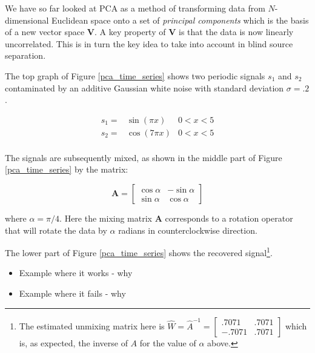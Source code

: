 \documentclass[11pt, oneside, a4paper]{report}
\begin{document}
We have so far looked at PCA as a method of transforming data from
$N$-dimensional Euclidean space onto a set of \emph{principal components}
which is the basis of a new vector space $\boldsymbol{V}$. A key property of $\boldsymbol{V}$ is
that the data is now linearly uncorrelated. This is in turn the key
idea to take into account in blind source separation.

The top graph of Figure \ref{pca_time_series} shows two periodic
signals $s_1$ and $s_2$ contaminated by an additive Gaussian white
noise with standard deviation $\sigma = .2$.


\begin{equation}
      \begin{array}{lll}
        s_1 = & \sin(\pi x) & 0<x<5\\
        s_2 = & \cos(7 \pi x) & 0<x<5\\
    \end{array}
\end{equation}

The signals are subsequently mixed, as shown in the middle part of
Figure \ref{pca_time_series} by the matrix:


\begin{equation}
  \boldsymbol{A} = \begin{bmatrix} \cos \alpha & -\sin \alpha \\ \sin \alpha & \cos \alpha \end{bmatrix}
\end{equation}

where $\alpha = \pi/4$. Here the mixing matrix $\boldsymbol{A}$ corresponds to a
rotation operator that will rotate the data by $\alpha$ radians in
counterclockwise direction. 


The lower part of Figure \ref{pca_time_series} shows the recovered
signal\footnote{The estimated unmixing matrix here is $\hat{W} =
  \hat{A}^{-1} = \begin{bmatrix} .7071 & .7071 \\ -.7071 &
    .7071 \end{bmatrix}$ which is, as expected, the inverse of $A$ for
  the value of $\alpha$ above.}.


\begin{itemize}
  \item Example where it works - why
  \item Example where it fails - why
\end{itemize}
\end{document}
